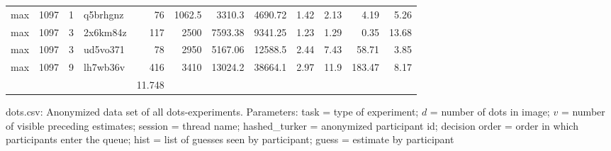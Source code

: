 \documentclass[9pt,a4paper,twocolumn,lineno]{article}
\begin{document}
\begin{table}
\begin{tabular}{lrrlrrrrrrrr}
 max      & 1097 &   1 & q5brhgnz &  76 &   1062.5 &  3310.3  &  4690.72 &  1.42 &   2.13 &   4.19 &         5.26 \\
 max      & 1097 &   3 & 2x6km84z & 117 &   2500   &  7593.38 &  9341.25 &  1.23 &   1.29 &   0.35 &        13.68 \\
 max      & 1097 &   3 & ud5vo371 &  78 &   2950   &  5167.06 & 12588.5  &  2.44 &   7.43 &  58.71 &         3.85 \\
 max      & 1097 &   9 & lh7wb36v & 416 &   3410   & 13024.2  & 38664.1  &  2.97 &  11.9  & 183.47 &         8.17 \\
\hline
 &&&& 11.748 &&&&&&& 
\\
\end{tabular}
\end{table}\label{table:S1}

dots.csv: Anonymized data set of all dots-experiments. Parameters: task = type of experiment; $d$ = number of dots in image; $v$ = number of visible preceding estimates; session = thread name; hashed\_turker = anonymized participant id; decision order = order in which participants enter the queue; hist = list of guesses seen by participant; guess = estimate by participant
 
\end{document}
